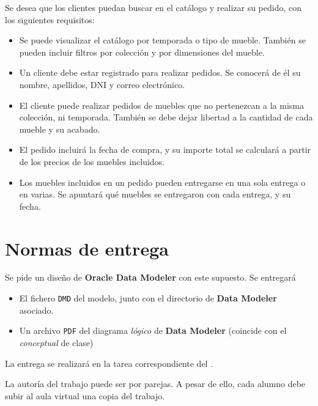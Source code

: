 Se desea que los clientes puedan buscar en el catálogo y realizar su pedido, con los siguientes requisitos:
\begin{itemize}
\item Se puede visualizar el catálogo por temporada o tipo de mueble. También se pueden incluir filtros por colección y por dimensiones del mueble.
\item Un cliente debe estar registrado para realizar pedidos. Se conocerá de él su nombre, apellidos, DNI y correo electrónico.
\item El cliente puede realizar pedidos de muebles que no pertenezcan a la misma colección, ni temporada. También se debe dejar libertad a la cantidad de cada mueble y su acabado.
\item El pedido incluirá la fecha de compra, y su importe total se calculará a partir de los precios de los muebles incluidos.
\item Los muebles incluidos en un pedido pueden entregarse en una sola entrega o en varias. Se apuntará qué muebles se entregaron con cada entrega, y su fecha.
\end{itemize}

\section{Normas de entrega}
Se pide un diseño de \textbf{Oracle Data Modeler} con este supuesto. Se entregará
\begin{itemize}
\item  El fichero \texttt{DMD} del modelo, junto con el directorio de \textbf{Data Modeler} asociado.
\item Un archivo \texttt{PDF} del diagrama \textit{lógico} de \textbf{Data Modeler} (coincide con el \textit{conceptual} de clase)
\end{itemize}

La entrega se realizará en la tarea correspondiente del .

La autoría del trabajo puede ser por parejas. A pesar de ello, cada alumno debe subir al aula virtual una copia del trabajo.



